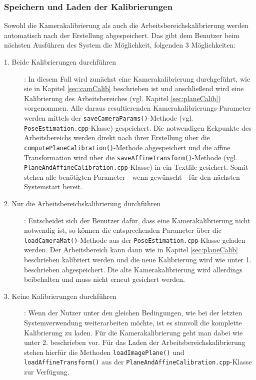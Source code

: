 \subsubsection{Speichern und Laden der Kalibrierungen}\label{sec:saveCalib}
Sowohl die Kamerakalibrierung als auch die Arbeitsbereichskalibrierung werden automatisch nach der Erstellung abgespeichert. Das gibt dem Benutzer beim nächsten Ausführen des System die Möglichkeit, folgenden 3 Möglichkeiten: 
\begin{description}
	\item[1. Beide Kalibrierungen durchführen]: In diesem Fall wird zunächst eine Kamerakalibrierung durchgeführt, wie sie in Kapitel \ref{sec:camCalib} beschrieben ist und anschließend wird eine Kalibrierung des Arbeitsbereiches (vgl. Kapitel \ref{sec:planeCalib}) vorgenommen. Alle daraus resultierenden Kamerakalibrierungs-Parameter werden mittels der \texttt{saveCameraParams()}-Methode (vgl. \texttt{PoseEstimation.cpp}-Klasse) gespeichert. Die notwendigen Eckpunkte des Arbeitsbereichs werden direkt nach ihrer Erstellung über die \texttt{computePlaneCalibration()}-Methode abgespeichert und die affine Transformation wird über die \texttt{saveAffineTransform()}-Methode (vgl. \texttt{PlaneAndAffineCalibration.cpp}-Klasse) in ein Textfile gesichert. Somit stehen alle benötigten Parameter - wenn gewünscht - für den nächsten Systemstart bereit.
	
	\item[2. Nur die Arbeitsbereichskalibrierung durchführen]: Entscheidet sich der Benutzer dafür, dass eine Kamerakalibrierung nicht notwendig ist, so können die entsprechenden Parameter über die \texttt{loadCameraMat()}-Methode aus der \texttt{PoseEstimation.cpp}-Klasse geladen werden. Der Arbeitsbereich kann dann wie in Kapitel \ref{sec:planeCalib} beschrieben kalibriert werden und die neue Kalibrierung wird wie unter 1. beschrieben abgespeichert. Die alte Kamerakalibrierung wird allerdings beibehalten und muss nicht erneut gesichert werden. 
	
	\item[3. Keine Kalibrierungen durchführen]: Wenn der Nutzer unter den gleichen Bedingungen, wie bei der letzten Systemverwendung weiterarbeiten möchte, ist es sinnvoll die komplette Kalibrierung zu laden. Für die Kamerakalibrierung geht man dabei wie unter 2. beschrieben vor. Für das Laden der Arbeitsbereichskalibrierung stehen hierfür die Methoden \texttt{loadImagePlane()} und \texttt{loadAffineTransform()} aus der \texttt{PlaneAndAffineCalibration.cpp}-Klasse zur Verfügung.
\end{description}
